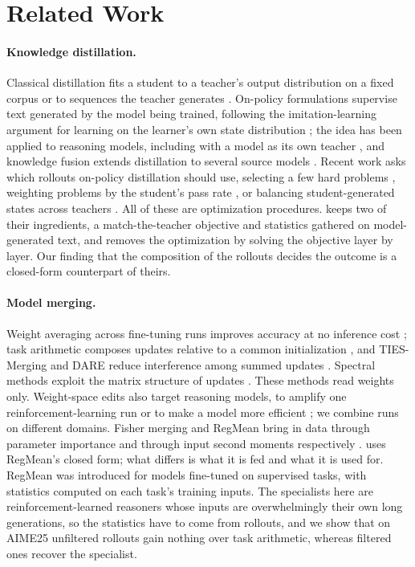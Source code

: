 \section{Related Work}
\label{sec:related}

\paragraph{Knowledge distillation.} Classical distillation fits a student to a
teacher's output distribution on a fixed corpus \citep{hinton2015distilling}
or to sequences the teacher generates \citep{kim2016sequence}. On-policy
formulations supervise text generated by the model being trained, following
the imitation-learning argument for learning on the learner's own state
distribution \citep{ross2011dagger,agarwal2024gkd,gu2024minillm}; the idea has
been applied to reasoning models, including with a model as its own teacher
\citep{zhao2026opsd}, and knowledge fusion extends distillation to several
source models \citep{wan2024fusellm}. Recent work asks which rollouts
on-policy distillation should use, selecting a few hard problems
\citep{hou2026whatmatters}, weighting problems by the student's pass rate
\citep{xu2026paced}, or balancing student-generated states across teachers
\citep{hou2026uniopd}. All of these are optimization procedures. \method keeps
two of their ingredients, a match-the-teacher objective and statistics
gathered on model-generated text, and removes the optimization by solving the
objective layer by layer. Our finding that the composition of the rollouts
decides the outcome is a closed-form counterpart of theirs.

\paragraph{Model merging.} Weight averaging across fine-tuning runs improves
accuracy at no inference cost \citep{wortsman2022soups}; task arithmetic
composes updates relative to a common initialization \citep{ilharco2023task},
and TIES-Merging and DARE reduce interference among summed updates
\citep{yadav2023ties,yu2024dare}. Spectral methods exploit the matrix structure
of updates \citep{gargiulo2024tsv,marczak2025isotropic,sun2026resmerge}. These
methods read weights only. Weight-space edits also target reasoning models,
to amplify one reinforcement-learning run
\citep{yang2026doesscalingreinforcementlearning} or to make a model more
efficient \citep{ma2026s3spectralnullspaceswap}; we combine runs on different
domains. Fisher merging and RegMean bring in data through parameter
importance and through input second moments respectively
\citep{matena2021fisher,jin2023regmean}. \method uses RegMean's closed form;
what differs is what it is fed and what it is used for. RegMean was introduced
for models fine-tuned on supervised tasks, with statistics computed on each
task's training inputs. The specialists here are reinforcement-learned
reasoners whose inputs are overwhelmingly their own long generations, so the
statistics have to come from rollouts, and we show that on AIME25 unfiltered
rollouts gain nothing over task arithmetic, whereas filtered ones recover the
specialist.

